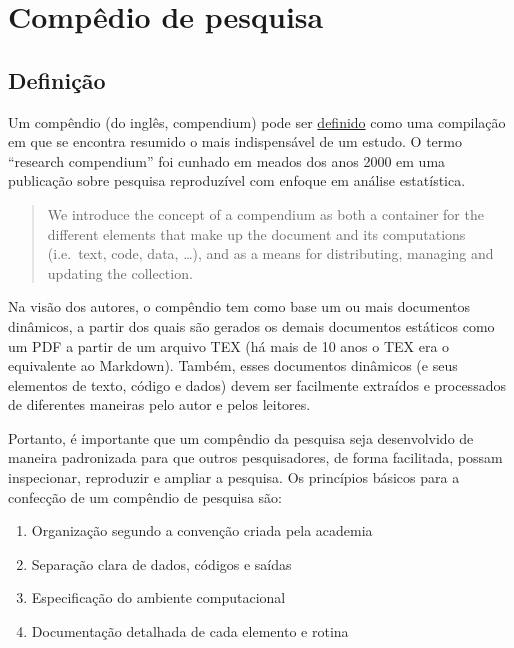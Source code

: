 \documentclass[]{book}
\providecommand{\tightlist}{%
  \setlength{\itemsep}{0pt}\setlength{\parskip}{0pt}}
\begin{document}
\hypertarget{compedio-de-pesquisa}{%
\chapter{Compêdio de pesquisa}\label{compedio-de-pesquisa}}

\hypertarget{definicao}{%
\section{Definição}\label{definicao}}

Um compêndio (do inglês, compendium) pode ser
\href{https://www.priberam.pt/dlpo/compêndio}{definido} como uma
compilação em que se encontra resumido o mais indispensável de um
estudo. O termo ``research compendium'' foi cunhado em meados dos anos
2000 em uma publicação sobre pesquisa reproduzível com enfoque em
análise estatística.

\begin{quote}
We introduce the concept of a compendium as both a container for the
different elements that make up the document and its computations
(i.e.~text, code, data, \ldots{}), and as a means for distributing,
managing and updating the
collection.\citep{Robert_Gentleman_Department_of_Biostatistics_Harvard_University2004-qt}
\end{quote}

Na visão dos autores, o compêndio tem como base um ou mais documentos
dinâmicos, a partir dos quais são gerados os demais documentos estáticos
como um PDF a partir de um arquivo TEX (há mais de 10 anos o TEX era o
equivalente ao Markdown). Também, esses documentos dinâmicos (e seus
elementos de texto, código e dados) devem ser facilmente extraídos e
processados de diferentes maneiras pelo autor e pelos leitores.

Portanto, é importante que um compêndio da pesquisa seja desenvolvido de
maneira padronizada para que outros pesquisadores, de forma facilitada,
possam inspecionar, reproduzir e ampliar a pesquisa. Os princípios
básicos para a confecção de um compêndio de pesquisa são:

\begin{enumerate}
\def\labelenumi{\arabic{enumi})}
\tightlist
\item
  Organização segundo a convenção criada pela academia
\item
  Separação clara de dados, códigos e saídas
\item
  Especificação do ambiente computacional
\item
  Documentação detalhada de cada elemento e rotina
\end{enumerate}
\end{document}
